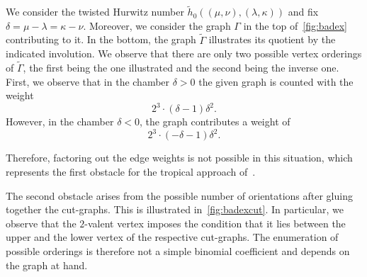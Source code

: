 \documentclass[ALCO,published]{cedram}
\begin{document}
\begin{exam}
We consider the twisted Hurwitz number $\tilde{h}_0((\mu,\nu),(\lambda,\kappa))$ and fix $\delta=\mu-\lambda=\kappa-\nu$. Moreover, we consider the graph $\Gamma$ in the top of~\cref{fig:badex} contributing to it. In the bottom, the graph $\tilde{\Gamma}$ illustrates its quotient by the indicated involution. We observe that there are only two possible vertex orderings of $\tilde{\Gamma}$, the first being the one illustrated and the second being the inverse one. First, we observe that in the chamber $\delta>0$ the given graph is counted with the weight
\begin{equation*}
    2^3\cdot (\delta-1)\delta^2.
\end{equation*}
However, in the chamber $\delta<0$, the graph contributes a weight of
\begin{equation*}
        2^3\cdot (-\delta-1)\delta^2.
\end{equation*}

Therefore, factoring out the edge weights is not possible in this situation, which represents the first obstacle for the tropical approach of~\cite{CJM11}.

The second obstacle arises from the possible number of orientations after gluing together the cut-graphs. This is illustrated in~\cref{fig:badexcut}. In particular, we observe that the $2$-valent vertex imposes the condition that it lies between the upper and the lower vertex of the respective cut-graphs. The enumeration of possible orderings is therefore not a simple binomial coefficient and depends on the graph at hand.
\end{exam}
\end{document}
